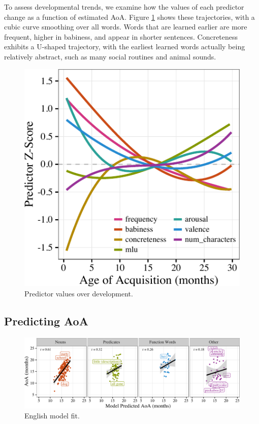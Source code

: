\documentclass[10pt, letterpaper]{article}
\newenvironment{CodeChunk}{}{}
\begin{document}
To assess developmental trends, we examine how the values of each
predictor change as a function of estimated AoA. Figure \ref{fig:devo}
shows these trajectories, with a cubic curve smoothing over all words.
Words that are learned earlier are more frequent, higher in babiness,
and appear in shorter sentences. Concreteness exhibits a U-shaped
trajectory, with the earliest learned words actually being relatively
abstract, such as many social routines and animal sounds.

\begin{CodeChunk}
\begin{figure}[tb]

{\centering \includegraphics{figs/devo-1} 

}

\caption[Predictor values over development]{Predictor values over development.}\label{fig:devo}
\end{figure}
\end{CodeChunk}

\subsection{Predicting AoA}\label{predicting-aoa}

\begin{CodeChunk}
\begin{figure}[tb]

{\centering \includegraphics{figs/fit-1} 

}

\caption[English model fit]{English model fit.}\label{fig:fit}
\end{figure}
\end{CodeChunk}
\end{document}
